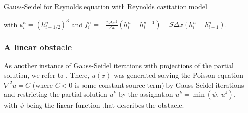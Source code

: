 \begin{minipage}[H]{\textwidth}
\begin{algorithm}[H]
\caption{Gauss-Seidel for Reynolds equation with Reynolds cavitation model}
\LinesNumbered
{}
\label{alg:gs_reynolds_reynoldsmodel}
\end{algorithm}
with $a^n_i=\left(h_{i+1/2}^n\right)^3$ and $f^n_i=-\frac{2\Delta x ^2}{\Delta t}\left(h_{i}^{n}-h_{i}^{n-1}\right)-S\Delta x\left(h_i^n-h_{i-1}^n\right)$.
\end{minipage}

\subsubsection*{A linear obstacle}
As another instance of Gauss-Seidel iterations with projections of the partial solution, we refer to . There, $u(x)$  was generated solving the Poisson equation $\nabla^2 u = C$ (where $C<0$ is some constant source term) by Gauss-Seidel iterations and restricting the partial solution $u^k$ by the assignation $u^k=\min(\psi,\,u^k)$, with $\psi$ being the linear function that describes the obstacle.
